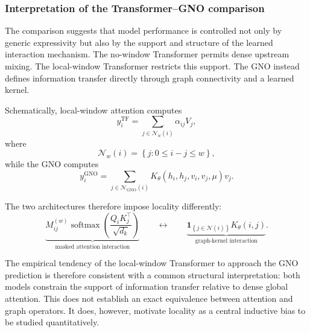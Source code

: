 \subsubsection{Interpretation of the Transformer--GNO comparison}
\label{subsubsec:tf_gno_interpretation}

The comparison suggests that model performance is controlled not only by generic expressivity but also by the support and structure of the learned interaction mechanism. The no-window Transformer permits dense upstream mixing. The local-window Transformer restricts this support. The GNO instead defines information transfer directly through graph connectivity and a learned kernel.

Schematically, local-window attention computes
\begin{equation}
y_i^{\mathrm{TF}}
=
\sum_{
j\in\mathcal{N}_{w}(i)
}
\alpha_{ij}V_j,
\label{eq:window_attention_result_view}
\end{equation}
where
\begin{equation}
\mathcal{N}_{w}(i)
=
\left\{
j
:
0
\le
i-j
\le
w
\right\},
\label{eq:window_neighborhood_results}
\end{equation}
while the GNO computes
\begin{equation}
y_i^{\mathrm{GNO}}
=
\sum_{
j\in\mathcal{N}_{\mathrm{GNO}}(i)
}
K_{\theta}
\left(
h_i,
h_j,
v_i,
v_j,
\mu
\right)
v_j.
\label{eq:gno_result_view}
\end{equation}

The two architectures therefore impose locality differently:
\begin{equation}
\underbrace{
M_{ij}^{(w)}
\operatorname{softmax}
\left(
\frac{
Q_iK_j^{\top}
}{
\sqrt{d_k}
}
\right)
}_{\text{masked attention interaction}}
\qquad
\longleftrightarrow
\qquad
\underbrace{
\mathbf{1}_{
\left\{
j\in\mathcal{N}(i)
\right\}
}
K_{\theta}(i,j)
}_{\text{graph-kernel interaction}}.
\label{eq:local_kernel_correspondence_results}
\end{equation}

The empirical tendency of the local-window Transformer to approach the GNO prediction is therefore consistent with a common structural interpretation: both models constrain the support of information transfer relative to dense global attention. This does not establish an exact equivalence between attention and graph operators. It does, however, motivate locality as a central inductive bias to be studied quantitatively.


